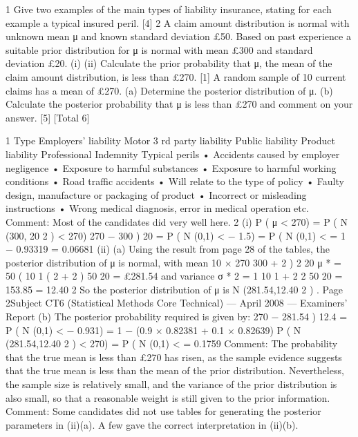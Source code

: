 1 Give two examples of the main types of liability insurance, stating for each example a
typical insured peril.
[4]
2 A claim amount distribution is normal with unknown mean μ and known standard
deviation £50. Based on past experience a suitable prior distribution for μ is normal
with mean £300 and standard deviation £20.
(i)
(ii)
Calculate the prior probability that μ, the mean of the claim amount
distribution, is less than £270.
[1]
A random sample of 10 current claims has a mean of £270.
(a) Determine the posterior distribution of μ.
(b) Calculate the posterior probability that μ is less than £270 and
comment on your answer.
[5]
[Total 6]

1
Type
Employers’ liability
Motor 3 rd party liability
Public liability
Product liability
Professional Indemnity
Typical perils
• Accidents caused by employer negligence
• Exposure to harmful substances
• Exposure to harmful working conditions
• Road traffic accidents
• Will relate to the type of policy
• Faulty design, manufacture or packaging of
product
• Incorrect or misleading instructions
• Wrong medical diagnosis, error in medical
operation etc.
Comment: Most of the candidates did very well here.
2
(i)
P ( μ < 270) = P ( N (300, 20 2 ) < 270)
270 − 300
)
20
= P ( N (0,1) < − 1.5)
= P ( N (0,1) <
= 1 − 0.93319
= 0.06681
(ii)
(a)
Using the result from page 28 of the tables, the posterior distribution of μ is
normal, with mean
10 × 270 300
+ 2 )
2
20
μ * = 50
(
10
1
( 2 + 2 )
50
20
= £281.54
and variance
σ * 2 =
1
10
1
+ 2
2
50
20
= 153.85 = 12.40 2
So the posterior distribution of μ is N (281.54,12.40 2 ) .
Page 2Subject CT6 (Statistical Methods Core Technical) — April 2008 — Examiners’ Report
(b)
The posterior probability required is given by:
270 − 281.54
)
12.4
= P ( N (0,1) < − 0.931)
= 1 − (0.9 × 0.82381 + 0.1 × 0.82639)
P ( N (281.54,12.40 2 ) < 270) = P ( N (0,1) <
= 0.1759
Comment: The probability that the true mean is less than £270 has risen, as the
sample evidence suggests that the true mean is less than the mean of the prior
distribution. Nevertheless, the sample size is relatively small, and the variance of the
prior distribution is also small, so that a reasonable weight is still given to the prior
information.
Comment: Some candidates did not use tables for generating the posterior
parameters in (ii)(a). A few gave the correct interpretation in (ii)(b).
